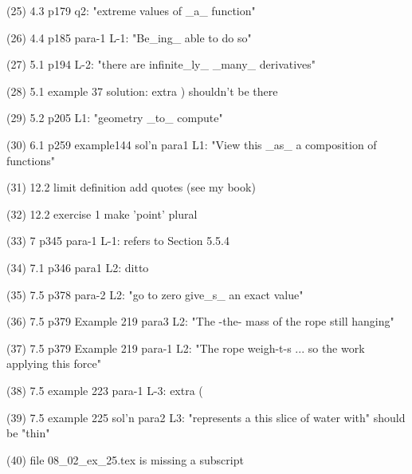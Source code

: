 (25)  4.3 p179 q2: "extreme values of _a_ function"

(26)  4.4 p185 para-1 L-1: "Be_ing_ able to do so"

(27)  5.1 p194 L-2: "there are infinite_ly_ _many_ derivatives"

(28)  5.1 example 37 solution: extra ) shouldn't be there

(29)  5.2 p205 L1: "geometry _to_ compute"

(30)  6.1 p259 example144 sol'n para1 L1: "View this _as_ a composition of functions"

(31)  12.2 limit definition add quotes (see my book)

(32)  12.2 exercise 1 make 'point' plural

(33)  7 p345 para-1 L-1: refers to Section 5.5.4

(34)  7.1 p346 para1 L2: ditto

(35)  7.5 p378 para-2 L2: "go to zero give_s_ an exact value"

(36)  7.5 p379 Example 219 para3 L2: "The -the- mass of the rope still hanging"

(37)  7.5 p379 Example 219 para-1 L2: "The rope weigh-t-s ... so the work applying this force"

(38)  7.5 example 223 para-1 L-3: extra (

(39)  7.5 example 225 sol'n para2 L3: "represents a this slice of water with" should be "thin"

(40)  file 08_02_ex_25.tex is missing a subscript

